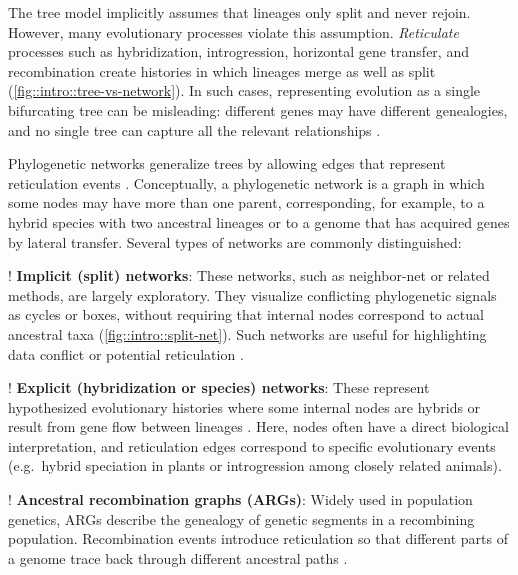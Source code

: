 The tree model implicitly assumes that lineages only split and never rejoin. However, many evolutionary processes violate this assumption. \emph{Reticulate} processes such as hybridization, introgression, horizontal gene transfer, and recombination create histories in which lineages merge as well as split (\autoref{fig::intro::tree-vs-network}). In such cases, representing evolution as a single bifurcating tree can be misleading: different genes may have different genealogies, and no single tree can capture all the relevant relationships \citep{moore_convergent_1997,kurland_horizontal_2003,huson_application_2006,galtier_model_2007}.



Phylogenetic networks generalize trees by allowing edges that represent reticulation events \citep{huson_application_2006}. Conceptually, a phylogenetic network is a graph in which some nodes may have more than one parent, corresponding, for example, to a hybrid species with two ancestral lineages or to a genome that has acquired genes by lateral transfer. Several types of networks are commonly distinguished:

\begin{fancyenumerate}
    \item! \textbf{Implicit (split) networks}: These networks, such as neighbor-net or related methods, are largely exploratory. They visualize conflicting phylogenetic signals as cycles or boxes, without requiring that internal nodes correspond to actual ancestral taxa (\autoref{fig::intro::split-net}). Such networks are useful for highlighting data conflict or potential reticulation \citep{bryant_neighbor-net_2004, huson_application_2006}.
    \item! \textbf{Explicit (hybridization or species) networks}: These represent hypothesized evolutionary histories where some internal nodes are hybrids or result from gene flow between lineages \citep{warnow_advances_2019, solis-lemus_phylonetworks_2017, hibbins_phylogenomic_2022}. Here, nodes often have a direct biological interpretation, and reticulation edges correspond to specific evolutionary events (e.g.\ hybrid speciation in plants or introgression among closely related animals).
    \item! \textbf{Ancestral recombination graphs (ARGs)}: Widely used in population genetics, ARGs describe the genealogy of genetic segments in a recombining population. Recombination events introduce reticulation so that different parts of a genome trace back through different ancestral paths \citep{griffiths_ancestral_1997, lewanski_era_2024}.
\end{fancyenumerate}

